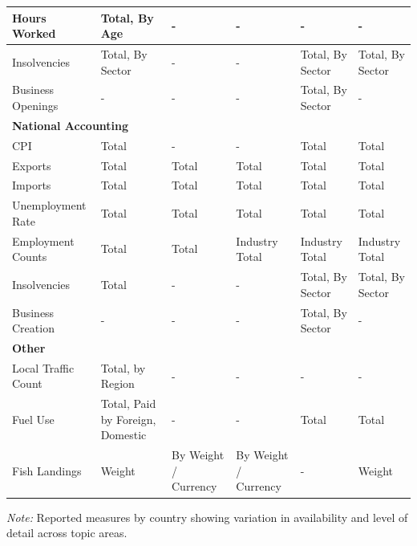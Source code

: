 \begin{table}
{\begin{tabular}[t]{l|l|l|l|l|l}
\hline
\hspace{1em}Hours Worked & Total, By Age & - & - & - & -\\
\hline
\hspace{1em}Insolvencies & Total, By Sector & - & - & Total, By Sector & Total, By Sector\\
\hline
\hspace{1em}Business Openings & - & - & - & Total, By Sector & -\\
\hline
\multicolumn{6}{l}{\textbf{National Accounting}}\\
\hline
\hspace{1em}CPI & Total & - & - & Total & Total\\
\hline
\hspace{1em}Exports & Total & Total & Total & Total & Total\\
\hline
\hspace{1em}Imports & Total & Total & Total & Total & Total\\
\hline
\hspace{1em}Unemployment Rate & Total & Total & Total & Total & Total\\
\hline
\hspace{1em}Employment Counts & Total & Total & Industry Total & Industry Total & Industry Total\\
\hline
\hspace{1em}Insolvencies & Total & - & - & Total, By Sector & Total, By Sector\\
\hline
\hspace{1em}Business Creation & - & - & - & Total, By Sector & -\\
\hline
\multicolumn{6}{l}{\textbf{Other}}\\
\hline
\hspace{1em}Local Traffic Count & Total, by Region & - & - & - & -\\
\hline
\hspace{1em}Fuel Use & Total, Paid by Foreign, Domestic & - & - & Total & Total\\
\hline
\hspace{1em}Fish Landings & Weight & By Weight / Currency & By Weight / Currency & - & Weight\\
\hline
\end{tabular}%
}
\begin{minipage}{\textwidth}
\raggedright\scriptsize \textit{Note:} Reported measures by country showing variation in availability and level of detail across topic areas.
\end{minipage}
\end{table}
